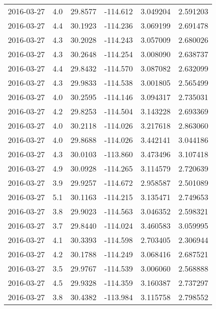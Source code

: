 \begin{tabular}{lrrrrr}
2016-03-27 &       4.0 &  29.8577 &  -114.612 &         3.049204 &         2.591203 \\
2016-03-27 &       4.4 &  30.1923 &  -114.236 &         3.069199 &         2.691478 \\
2016-03-27 &       4.3 &  30.2028 &  -114.243 &         3.057009 &         2.680026 \\
2016-03-27 &       4.3 &  30.2648 &  -114.254 &         3.008090 &         2.638737 \\
2016-03-27 &       4.4 &  29.8432 &  -114.570 &         3.087082 &         2.632099 \\
2016-03-27 &       4.3 &  29.9833 &  -114.538 &         3.001805 &         2.565499 \\
2016-03-27 &       4.0 &  30.2595 &  -114.146 &         3.094317 &         2.735031 \\
2016-03-27 &       4.2 &  29.8253 &  -114.504 &         3.143228 &         2.693369 \\
2016-03-27 &       4.0 &  30.2118 &  -114.026 &         3.217618 &         2.863060 \\
2016-03-27 &       4.0 &  29.8688 &  -114.026 &         3.442141 &         3.044186 \\
2016-03-27 &       4.3 &  30.0103 &  -113.860 &         3.473496 &         3.107418 \\
2016-03-27 &       4.9 &  30.0928 &  -114.265 &         3.114579 &         2.720639 \\
2016-03-27 &       3.9 &  29.9257 &  -114.672 &         2.958587 &         2.501089 \\
2016-03-27 &       5.1 &  30.1163 &  -114.215 &         3.135471 &         2.749653 \\
2016-03-27 &       3.8 &  29.9023 &  -114.563 &         3.046352 &         2.598321 \\
2016-03-27 &       3.7 &  29.8440 &  -114.024 &         3.460583 &         3.059995 \\
2016-03-27 &       4.1 &  30.3393 &  -114.598 &         2.703405 &         2.306944 \\
2016-03-27 &       4.2 &  30.1788 &  -114.249 &         3.068416 &         2.687521 \\
2016-03-27 &       3.5 &  29.9767 &  -114.539 &         3.006060 &         2.568888 \\
2016-03-27 &       4.5 &  29.9328 &  -114.359 &         3.160387 &         2.737297 \\
2016-03-27 &       3.8 &  30.4382 &  -113.984 &         3.115758 &         2.798552 \\

\end{tabular}
